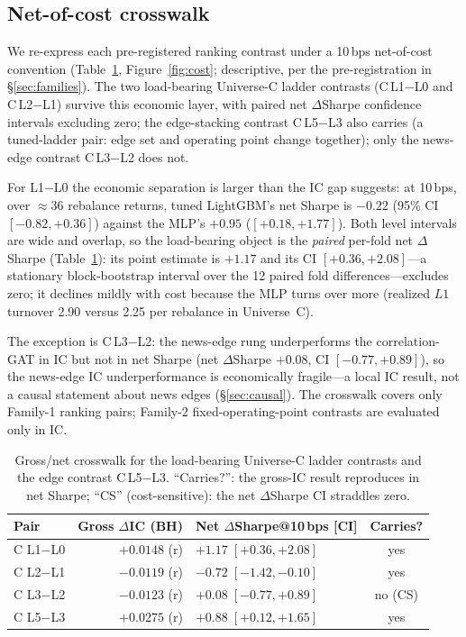 \documentclass{article}
\newcommand{\compacttable}{\small\setlength{\tabcolsep}{4pt}\renewcommand{\arraystretch}{0.95}}
\begin{document}
\subsection{Net-of-cost crosswalk}\label{sec:cost}
We re-express each pre-registered ranking contrast under a 10\,bps net-of-cost convention (Table~\ref{tab:cost}, Figure~\ref{fig:cost}; descriptive, per the pre-registration in \S\ref{sec:families}). The two load-bearing Universe-C ladder contrasts (C\,L1$-$L0 and C\,L2$-$L1) survive this economic layer, with paired net $\Delta$Sharpe confidence intervals excluding zero; the edge-stacking contrast C\,L5$-$L3 also carries (a tuned-ladder pair: edge set and operating point change together); only the news-edge contrast C\,L3$-$L2 does not.

For L1$-$L0 the economic separation is larger than the IC gap suggests: at 10\,bps, over ${\approx}36$ rebalance returns, tuned LightGBM's net Sharpe is $-0.22$ (95\% CI $[-0.82,+0.36]$) against the MLP's $+0.95$ ($[+0.18,+1.77]$). Both level intervals are wide and overlap, so the load-bearing object is the \emph{paired} per-fold net $\Delta$Sharpe (Table~\ref{tab:cost}): its point estimate is $+1.17$ and its CI $[+0.36,+2.08]$---a stationary block-bootstrap interval over the 12 paired fold differences---excludes zero; it declines mildly with cost because the MLP turns over more (realized $L1$ turnover 2.90 versus 2.25 per rebalance in Universe~C).

The exception is C\,L3$-$L2: the news-edge rung underperforms the correlation-GAT in IC but not in net Sharpe (net $\Delta$Sharpe $+0.08$, CI $[-0.77,+0.89]$), so the news-edge IC underperformance is economically fragile---a local IC result, not a causal statement about news edges (\S\ref{sec:causal}). The crosswalk covers only Family-1 ranking pairs; Family-2 fixed-operating-point contrasts are evaluated only in IC.

\begin{table}[t]
  \centering
  \caption{Gross/net crosswalk for the load-bearing Universe-C ladder contrasts and the edge contrast C\,L5$-$L3. ``Carries?'': the gross-IC result reproduces in net Sharpe; ``CS'' (cost-sensitive): the net $\Delta$Sharpe CI straddles zero.}
  \label{tab:cost}
  \compacttable
  \begin{tabular}{@{}l r l c@{}}
    \toprule
    Pair & Gross $\Delta$IC (BH) & Net $\Delta$Sharpe@10\,bps [CI] & Carries? \\
    \midrule
    C L1$-$L0 & $+0.0148$ (r) & $+1.17\;[+0.36,+2.08]$ & yes \\
    C L2$-$L1 & $-0.0119$ (r) & $-0.72\;[-1.42,-0.10]$ & yes \\
    C L3$-$L2 & $-0.0123$ (r) & $+0.08\;[-0.77,+0.89]$ & no (CS) \\
    C L5$-$L3 & $+0.0275$ (r) & $+0.88\;[+0.12,+1.65]$ & yes \\
    \bottomrule
  \end{tabular}
\end{table}
\end{document}
